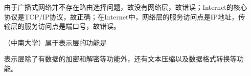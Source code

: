 \par{}
\begin{solution}由于广播式网络并不存在路由选择问题，故没有网络层，故错误；Internet的核心协议是TCP/IP协议，故正确；在Internet中，网络层的服务访问点是IP地址，传输层的服务访问点是端口号，故错误。
\end{solution}
\question （中南大学）属于表示层的功能是
\par{}
\begin{solution}表示层除了有数据的加密和解密等功能外，还有文本压缩以及数据格式转换等功能。
\end{solution}
